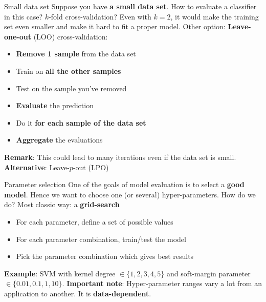 \documentclass{beamer}
\newcommand{\1}[1]{\mathbbm{1}\left[#1\right]}
\begin{document}
\begin{frame}{Small data set}
Suppose you have \textbf{a small data set}. How to evaluate a classifier in this case?
\vfill
\pause
$k$-fold cross-validation? Even with $k = 2$, it would make the training set even smaller and make it hard to fit a proper model.
\vfill
\pause
Other option: \textbf{Leave-one-out} (LOO) cross-validation:
\pause
\begin{itemize}
	\item \textbf{Remove 1 sample} from the data set
	\item Train on \textbf{all the other samples}
	\item Test on the sample you've removed
	\item \textbf{Evaluate} the prediction
	\item Do it \textbf{for each sample of the data set}
	\item \textbf{Aggregate} the evaluations
\end{itemize}
\pause
\vfill
\textbf{Remark}: This could lead to many iterations even if the data set is small.
\pause
\vfill
\textbf{Alternative}: Leave-$p$-out (LPO)
\end{frame}

\begin{frame}{Parameter selection}
One of the goals of model evaluation is to select a \textbf{good model}.
\vfill
\pause
Hence we want to choose one (or several) hyper-parameters. How do we do?
\vfill
\pause
Most classic way: a \textbf{grid-search}
\begin{itemize}
	\item For each parameter, define a set of possible values
	\item For each parameter combination, train/test the model
	\item Pick the parameter combination which gives best results
\end{itemize}
\vfill
\pause
\textbf{Example}: SVM with kernel degree $\in \{1, 2, 3, 4, 5\}$ and soft-margin parameter $\in \{0.01, 0.1, 1, 10 \}$.
\vfill
\pause
\textbf{Important note}: Hyper-parameter ranges vary a lot from an application to another. It is \textbf{data-dependent}.
\end{frame}
\end{document}
